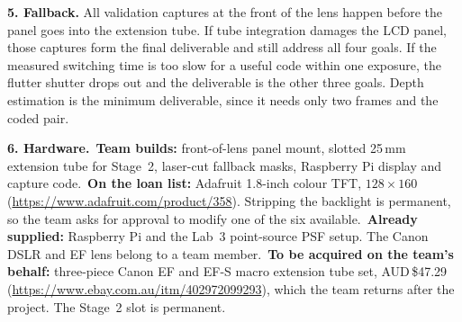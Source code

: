 \noindent\textbf{5. Fallback.}
All validation captures at the front of the lens happen before the panel goes into the extension tube. If tube integration damages the LCD panel, those captures form the final deliverable and still address all four goals. If the measured switching time is too slow for a useful code within one exposure, the flutter shutter drops out and the deliverable is the other three goals. Depth estimation is the minimum deliverable, since it needs only two frames and the coded pair.



\vspace{0.4em}
\noindent\textbf{6. Hardware.}\
\textbf{Team builds:} front-of-lens panel mount, slotted 25\,mm extension tube for Stage~2, laser-cut fallback masks, Raspberry Pi display and capture code.\
\textbf{On the loan list:} Adafruit 1.8-inch colour TFT, $128 \times 160$ (\url{https://www.adafruit.com/product/358}). Stripping the backlight is permanent, so the team asks for approval to modify one of the six available.\
\textbf{Already supplied:} Raspberry Pi and the Lab~3 point-source PSF setup. The Canon DSLR and EF lens belong to a team member.\
\textbf{To be acquired on the team's behalf:} three-piece Canon EF and EF-S macro extension tube set, AUD\,\$47.29 (\url{https://www.ebay.com.au/itm/402972099293}), which the team returns after the project. The Stage~2 slot is permanent.
\newpage
